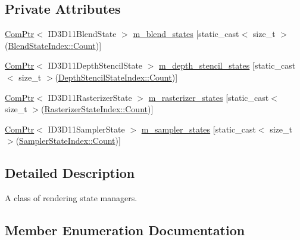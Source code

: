 \subsection*{Private Attributes}
\begin{DoxyCompactItemize}
\item 
\hyperlink{namespacemage_ae74f374780900893caa5555d1031fd79}{Com\+Ptr}$<$ I\+D3\+D11\+Blend\+State $>$ \hyperlink{classmage_1_1_rendering_state_manager_ad50dc7c990bf42580e511c55684e6630}{m\+\_\+blend\+\_\+states} \mbox{[}static\+\_\+cast$<$ size\+\_\+t $>$(\hyperlink{classmage_1_1_rendering_state_manager_ae8ea18eb352ae4cf9e23b41f10578984ae93f994f01c537c4e2f7d8528c3eb5e9}{Blend\+State\+Index\+::\+Count})\mbox{]}
\item 
\hyperlink{namespacemage_ae74f374780900893caa5555d1031fd79}{Com\+Ptr}$<$ I\+D3\+D11\+Depth\+Stencil\+State $>$ \hyperlink{classmage_1_1_rendering_state_manager_a8bd01105789b3aac90ee56a0322f98e8}{m\+\_\+depth\+\_\+stencil\+\_\+states} \mbox{[}static\+\_\+cast$<$ size\+\_\+t $>$(\hyperlink{classmage_1_1_rendering_state_manager_abcfd0e984d2ba2710320882430d6871aae93f994f01c537c4e2f7d8528c3eb5e9}{Depth\+Stencil\+State\+Index\+::\+Count})\mbox{]}
\item 
\hyperlink{namespacemage_ae74f374780900893caa5555d1031fd79}{Com\+Ptr}$<$ I\+D3\+D11\+Rasterizer\+State $>$ \hyperlink{classmage_1_1_rendering_state_manager_aa9ecd4ca82954b3d457e811bf44d835a}{m\+\_\+rasterizer\+\_\+states} \mbox{[}static\+\_\+cast$<$ size\+\_\+t $>$(\hyperlink{classmage_1_1_rendering_state_manager_aa8eee3b02b7d4ba0a046870fae43640aae93f994f01c537c4e2f7d8528c3eb5e9}{Rasterizer\+State\+Index\+::\+Count})\mbox{]}
\item 
\hyperlink{namespacemage_ae74f374780900893caa5555d1031fd79}{Com\+Ptr}$<$ I\+D3\+D11\+Sampler\+State $>$ \hyperlink{classmage_1_1_rendering_state_manager_ae486a0cc711b5b02af4364a3f7184ccd}{m\+\_\+sampler\+\_\+states} \mbox{[}static\+\_\+cast$<$ size\+\_\+t $>$(\hyperlink{classmage_1_1_rendering_state_manager_a17ea0fda0247ee5d379b62a882db95a3ae93f994f01c537c4e2f7d8528c3eb5e9}{Sampler\+State\+Index\+::\+Count})\mbox{]}
\end{DoxyCompactItemize}


\subsection{Detailed Description}
A class of rendering state managers. 

\subsection{Member Enumeration Documentation}
\hypertarget{classmage_1_1_rendering_state_manager_ae8ea18eb352ae4cf9e23b41f10578984}{}\label{classmage_1_1_rendering_state_manager_ae8ea18eb352ae4cf9e23b41f10578984} 
